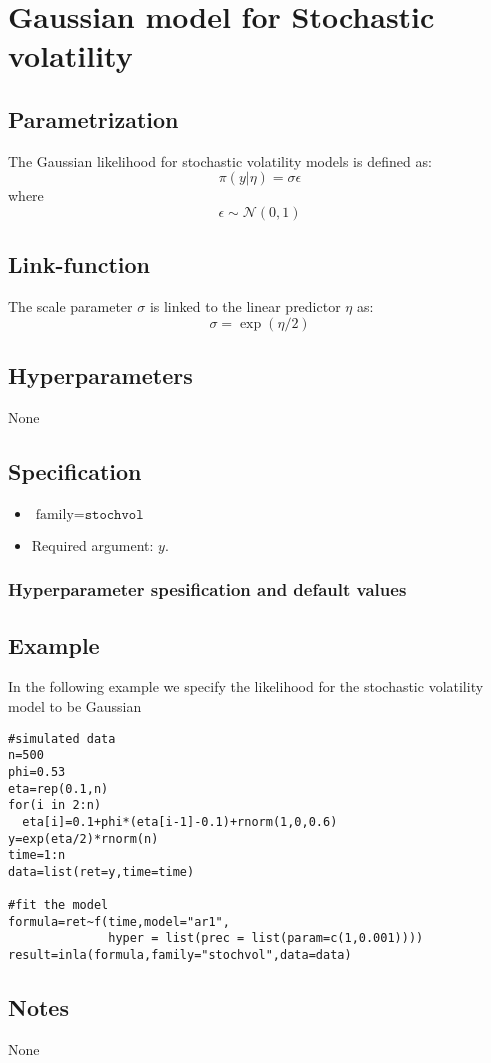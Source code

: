 \documentclass[a4paper,11pt]{article}
\begin{document}
\section*{Gaussian model for Stochastic volatility}

\subsection*{Parametrization}

The Gaussian likelihood for stochastic volatility models is defined
as:
\[
\pi(y |\eta )=\sigma \epsilon
\]
where
\[
\epsilon \sim\mathcal{N}(0,1)
\]

\subsection*{Link-function}

The scale parameter $\sigma $ is linked to the linear predictor $\eta
$ as:
\[
\sigma =\exp(\eta /2)
\]


\subsection*{Hyperparameters}

None

\subsection*{Specification}

\begin{itemize}
\item $\text{family}=\texttt{stochvol}$
\item Required argument: $y$.
\end{itemize}

\subsubsection*{Hyperparameter spesification and default values}


\subsection*{Example}
In the following example we specify the likelihood for the stochastic
volatility model to be Gaussian
 
\begin{verbatim}
#simulated data
n=500
phi=0.53
eta=rep(0.1,n)
for(i in 2:n)
  eta[i]=0.1+phi*(eta[i-1]-0.1)+rnorm(1,0,0.6)
y=exp(eta/2)*rnorm(n)
time=1:n
data=list(ret=y,time=time)

#fit the model
formula=ret~f(time,model="ar1",
              hyper = list(prec = list(param=c(1,0.001))))
result=inla(formula,family="stochvol",data=data)

\end{verbatim}

\subsection*{Notes}

None
\end{document}
